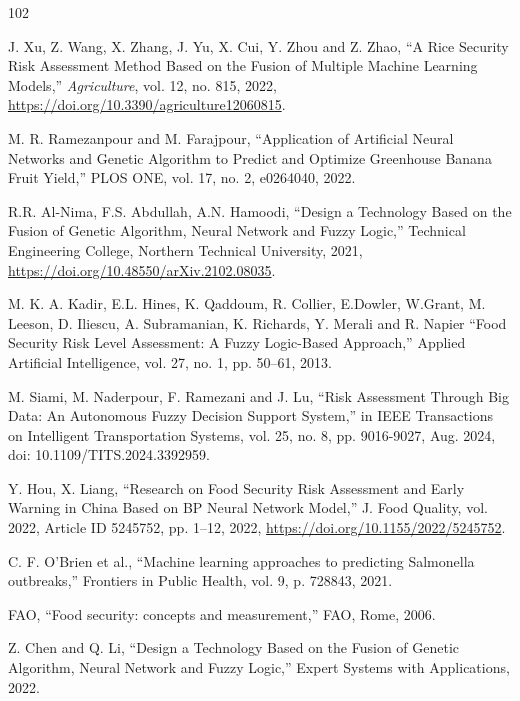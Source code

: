 \documentclass[preprint,12pt]{elsarticle}
\begin{document}
	\iffalse
	\begin{thebibliography}{102}
		
		J. Xu, Z. Wang, X. Zhang, J. Yu, X. Cui, Y. Zhou and Z. Zhao, ``A Rice Security Risk Assessment Method Based on the Fusion of Multiple Machine Learning Models,'' \emph{Agriculture}, vol. 12, no. 815, 2022, \url{https://doi.org/10.3390/agriculture12060815}.
		
		M. R. Ramezanpour and M. Farajpour, ``Application of Artificial Neural Networks and Genetic Algorithm to Predict and Optimize Greenhouse Banana Fruit Yield,'' PLOS ONE, vol. 17, no. 2, e0264040, 2022.
		
		R.R. Al-Nima, F.S. Abdullah, A.N. Hamoodi, ``Design a Technology Based on the Fusion of Genetic Algorithm, Neural Network and Fuzzy Logic,'' Technical Engineering College, Northern Technical University, 2021, \url{https://doi.org/10.48550/arXiv.2102.08035}.
		
		M. K. A. Kadir, E.L. Hines, K. Qaddoum, R. Collier, E.Dowler, W.Grant, M. Leeson, D. Iliescu, A. Subramanian, K. Richards, Y. Merali and R. Napier ``Food Security Risk Level Assessment: A Fuzzy Logic-Based Approach,'' Applied Artificial Intelligence, vol. 27, no. 1, pp. 50--61, 2013.
		
		M. Siami, M. Naderpour, F. Ramezani and J. Lu, ``Risk Assessment Through Big Data: An Autonomous Fuzzy Decision Support System,'' in IEEE Transactions on Intelligent Transportation Systems, vol. 25, no. 8, pp. 9016-9027, Aug. 2024, doi: 10.1109/TITS.2024.3392959.
		
		Y. Hou, X. Liang, ``Research on Food Security Risk Assessment and Early Warning in China Based on BP Neural Network Model,'' J. Food Quality, vol. 2022, Article ID 5245752, pp. 1--12, 2022, \url{https://doi.org/10.1155/2022/5245752}.
		
		C. F. O'Brien et al., ``Machine learning approaches to predicting Salmonella outbreaks,'' Frontiers in Public Health, vol. 9, p. 728843, 2021.
		
		FAO, ``Food security: concepts and measurement,'' FAO, Rome, 2006.
		
		Z. Chen and Q. Li, ``Design a Technology Based on the Fusion of Genetic Algorithm, Neural Network and Fuzzy Logic,'' Expert Systems with Applications, 2022.
		

\end{thebibliography}
\end{document}
